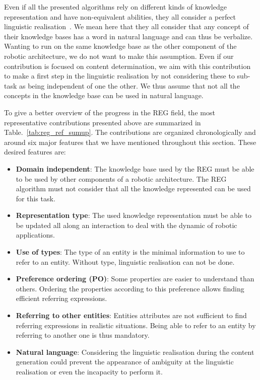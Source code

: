 Even if all the presented algorithms rely on different kinds of knowledge representation and have non-equivalent abilities, they all consider a perfect linguistic realisation~\cite{krahmer_2012_computational}. We mean here that they all consider that any concept of their knowledge bases has a word in natural language and can thus be verbalize. Wanting to run on the same knowledge base as the other component of the robotic architecture, we do not want to make this assumption. Even if our contribution is focused on content determination, we aim with this contribution to make a first step in the linguistic realisation by not considering these to sub-task as being independent of one the other. We thus assume that not all the concepts in the knowledge base can be used in natural language.

To give a better overview of the progress in the REG field, the most representative contributions presented above are summarized in Table.~\ref{tab:reg_ref_sumup}. The contributions are organized chronologically and around six major features that we have mentioned throughout this section. These desired features are:
\begin{itemize}
	\item \textbf{Domain independent}: The knowledge base used by the REG must be able to be used by other components of a robotic architecture. The REG algorithm must not consider that all the knowledge represented can be used for this task.
	\item \textbf{Representation type}: The used knowledge representation must be able to be updated all along an interaction to deal with the dynamic of robotic applications.
	\item \textbf{Use of types}: The type of an entity is the minimal information to use to refer to an entity. Without type, linguistic realisation can not be done.
	\item \textbf{Preference ordering (PO)}: Some properties are easier to understand than others. Ordering the properties according to this preference allows finding efficient referring expressions.
	\item \textbf{Referring to other entities}: Entities attributes are not sufficient to find referring expressions in realistic situations. Being able to refer to an entity by referring to another one is thus mandatory.
	\item \textbf{Natural language}: Considering the linguistic realisation during the content generation could prevent the appearance of ambiguity at the linguistic realisation or even the incapacity to perform it.
\end{itemize}


